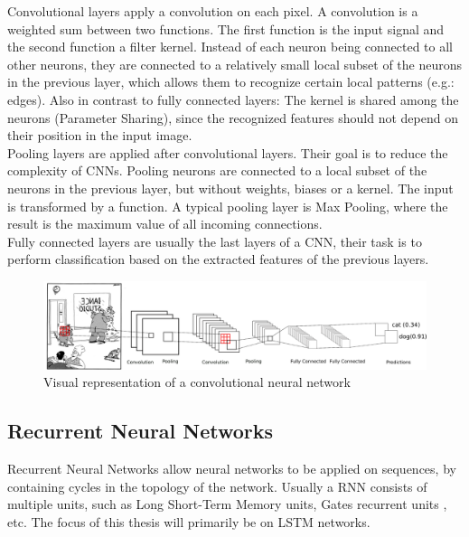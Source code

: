 \documentclass[draft,final,oneside]{vutinfth} %
\begin{document}
Convolutional layers apply a convolution on each pixel. A convolution is a weighted sum between two functions. The first function is the input signal and the second function a filter kernel. Instead of each neuron being connected to all other neurons, they are connected to a relatively small local subset of the neurons in the previous layer, which allows them to recognize certain local patterns (e.g.: edges). Also in contrast to fully connected layers: The kernel is shared among the neurons (Parameter Sharing), since the recognized features should not depend on their position in the input image. \\

Pooling layers are applied after convolutional layers. Their goal is to reduce the complexity of CNNs. Pooling neurons are connected to a local subset of the neurons in the previous layer, but without weights, biases or a kernel. The input is transformed by a function. A typical pooling layer is Max Pooling, where the result is the maximum value of all incoming connections. \\

Fully connected layers are usually the last layers of a CNN, their task is to perform classification based on the extracted features of the previous layers. \\

\begin{figure}[ht]
	\centering
  	\includegraphics[width=1.0\textwidth]{graphics/cnn.png}
	\caption{Visual representation of a convolutional neural network}
	\label{fig:feedforward}
\end{figure}
\pagebreak
\subsection{Recurrent Neural Networks}
Recurrent Neural Networks allow neural networks to be applied on sequences, by containing cycles in the topology of the network. Usually a RNN consists of multiple units, such as Long Short-Term Memory units, Gates recurrent units \cite{gru}, etc. The focus of this thesis will primarily be on LSTM networks. \\
\end{document}
